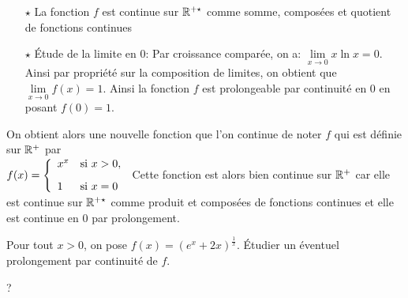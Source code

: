 \documentclass[a4paper, 11pt,reqno]{article}
\begin{document}
\begin{correction}
\begin{enumerate}
\begin{itemize}
			            \begin{itemize}
				            \item[$\star$] La fonction $f$ est continue sur $\mathbb{R}^{+\star}$ comme somme, compos\'ees et quotient de fonctions continues
				            \item[$\star$] \'Etude de la limite en $0$: Par croissance compar\'ee, on a: $\lim\limits_{x\to 0} x\ln{x}=0$. Ainsi par propri\'et\'e sur la composition de limites, on obtient que $\lim\limits_{x\to 0} f(x)=1$. Ainsi la fonction $f$ est prolongeable par continuit\'e en $0$ en posant $f(0)=1$.
			            \end{itemize}
		      \end{itemize}
		      On obtient alors une nouvelle fonction que l'on continue de noter $f$ qui est d\'efinie sur $\mathbb{R}^+$ par\\
		      \noindent  $f(x)=\left\lbrace \begin{array}{ll} x^x & \hbox{si}\ x>0,\vsec\\ 1& \hbox{si}\ x=0 \end{array}\right.$ Cette fonction est alors bien continue sur $\mathbb{R}^+$ car elle est continue sur $\mathbb{R}^{+\star}$ comme produit et compos\'ees de fonctions continues et elle est continue en $0$ par prolongement.
	\end{enumerate}
\end{correction}


\begin{exercice}
	Pour tout $x>0$, on pose $f(x)=\left( e^x+2x \right)^{\frac{1}{x}}$. \'Etudier un \'eventuel prolongement par continuit\'e de $f$.
\end{exercice}
\begin{correction}
    ?
\end{correction}
\end{document}
